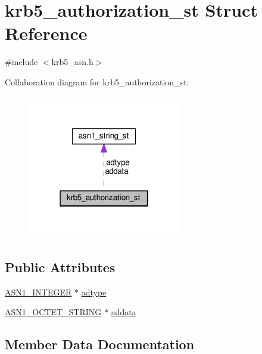 \hypertarget{structkrb5__authorization__st}{}\section{krb5\+\_\+authorization\+\_\+st Struct Reference}
\label{structkrb5__authorization__st}


{\ttfamily \#include $<$krb5\+\_\+asn.\+h$>$}



Collaboration diagram for krb5\+\_\+authorization\+\_\+st\+:
\nopagebreak
\begin{figure}[H]
\begin{center}
\leavevmode
\includegraphics[width=190pt]{structkrb5__authorization__st__coll__graph}
\end{center}
\end{figure}
\subsection*{Public Attributes}
\begin{DoxyCompactItemize}
\item 
\hyperlink{ossl__typ_8h_af4335399bf9774cb410a5e93de65998b}{A\+S\+N1\+\_\+\+I\+N\+T\+E\+G\+ER} $\ast$ \hyperlink{structkrb5__authorization__st_a3e75f4cc0ea59482895df0c540561f82}{adtype}
\item 
\hyperlink{ossl__typ_8h_afbd05e94e0f0430a2b729473efec88c1}{A\+S\+N1\+\_\+\+O\+C\+T\+E\+T\+\_\+\+S\+T\+R\+I\+NG} $\ast$ \hyperlink{structkrb5__authorization__st_a26158edad70a1f032c0203033439a5cf}{addata}
\end{DoxyCompactItemize}


\subsection{Member Data Documentation}
